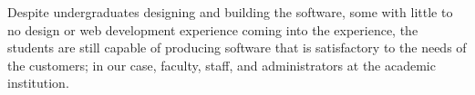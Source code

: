 Despite undergraduates designing and building the software, some with little to no design or web development experience coming into the experience, the students are still capable of producing software that is satisfactory to the needs of the customers; in our case, faculty, staff, and administrators at the academic institution. %






